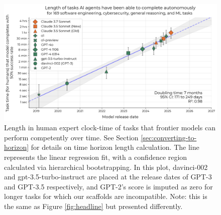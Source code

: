 \documentclass{article}
\begin{document}
\begin{figure}
    \centering
    \includegraphics[width=0.9\linewidth]{plots/bootstrap/headline-log.png}
    \caption{Length in human expert clock-time of tasks that frontier models can perform competently over time.
    See Section \ref{sec:converting-to-horizon} for details on time horizon length calculation.
    The line represents the linear regression fit, with a confidence region calculated via hierarchical bootstrapping. 
    In this plot, davinci-002 and gpt-3.5-turbo-instruct are placed at the release dates of GPT-3 and GPT-3.5 respectively, and GPT-2's score is imputed as zero for longer tasks for which our scaffolds are incompatible. Note: this is the same as Figure \ref{fig:headline} but presented differently.}
    \label{fig:headline-legend}
\end{figure}



   
\end{document}
